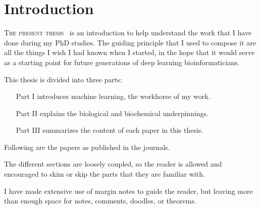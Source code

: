 \chapter{Introduction}

\lettrine[lines=3, lhang=0.25,  nindent=0em, findent=2pt]{\color{Maroon}T}{he present thesis\ }
is an introduction to help understand the work that I have done during my PhD studies.
The guiding principle that I used to compose it are all the things I wish I had known when I started, in the hope that it would serve as a starting point for future generations of deep learning bioinformaticians.

This thesis is divided into three parts:

\begin{itemize}
	\item[Part I] introduces machine learning, the workhorse of my work.
	\item[Part II] explains the biological and biochemical underpinnings.
	\item[Part III] summarizes the content of each paper in this thesis.
\end{itemize}

Following are the papers as published in the journals.

The different sections are loosely coupled, so the reader is allowed and encouraged to skim or skip the parts that they are familiar with.

I have made extensive use of margin notes to guide the reader, but leaving more than enough space for notes, comments, doodles, or theorems.

